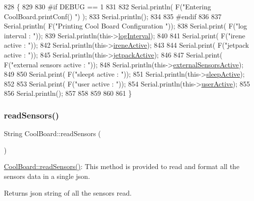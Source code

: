 \begin{DoxyCode}
828 \{
829 
830 \textcolor{preprocessor}{#if DEBUG == 1}
831     
832     Serial.println( F(\textcolor{stringliteral}{"Entering CoolBoard.printConf() "}) );
833     Serial.println();
834 
835 \textcolor{preprocessor}{#endif}
836 
837     Serial.println( F(\textcolor{stringliteral}{"Printing Cool Board Configuration "}));
838     Serial.print( F(\textcolor{stringliteral}{"log interval       : "}));
839     Serial.println(this->\hyperlink{class_cool_board_a84bc94413b64973e4aba8c467c97006c}{logInterval});
840 
841     Serial.print( F(\textcolor{stringliteral}{"irene active       : "}));
842     Serial.println(this->\hyperlink{class_cool_board_a9c3f7ac625481ee2ae802a25d97a4ae0}{ireneActive});
843 
844     Serial.print( F(\textcolor{stringliteral}{"jetpack active     : "}));
845     Serial.println(this->\hyperlink{class_cool_board_a9be03a913d26e558328935ca3b59a75e}{jetpackActive});
846 
847     Serial.print( F(\textcolor{stringliteral}{"external sensors active    : "}));
848     Serial.println(this->\hyperlink{class_cool_board_a638b00b76aeb819ecfd4c10b8cdd7bb7}{externalSensorsActive});
849 
850     Serial.print( F(\textcolor{stringliteral}{"sleept active      : "}));
851     Serial.println(this->\hyperlink{class_cool_board_a0a51b2287139f66c738101fb53139230}{sleepActive});
852 
853     Serial.print( F(\textcolor{stringliteral}{"user active        : "}));
854     Serial.println(this->\hyperlink{class_cool_board_a6395459131d6889a3005f79c7a35e964}{userActive});
855 
856     Serial.println();
857 
858 
859 
860 
861 \}
\end{DoxyCode}
\mbox{\label{class_cool_board_ad03abdce2e65f520bbf2cff0f2d083cf}} 
\subsubsection{\texorpdfstring{read\+Sensors()}{readSensors()}}
{\footnotesize\ttfamily String Cool\+Board\+::read\+Sensors (\begin{DoxyParamCaption}{ }\end{DoxyParamCaption})}

\hyperlink{class_cool_board_ad03abdce2e65f520bbf2cff0f2d083cf}{Cool\+Board\+::read\+Sensors()}\+: This method is provided to read and format all the sensors data in a single json.

\begin{DoxyReturn}{Returns}
json string of all the sensors read. 
\end{DoxyReturn}


